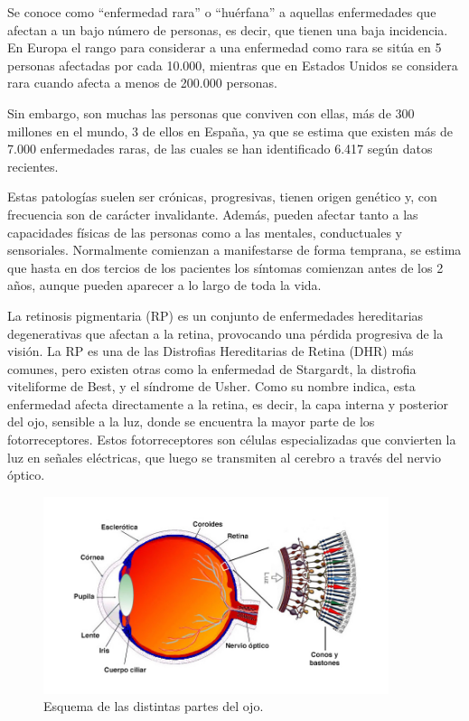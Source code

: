 \documentclass[11pt,spanish,listoffigures,listoftables]{tfgetsinf}
\begin{document}
Se conoce como “enfermedad rara” o “huérfana” a aquellas enfermedades que afectan a un bajo número de personas, es decir, que tienen una baja incidencia. En Europa el rango para considerar a una enfermedad como rara se sitúa en 5 personas afectadas por cada 10.000, mientras que en Estados Unidos se considera rara cuando afecta a menos de 200.000 personas\cite{ENF}.

Sin embargo, son muchas las personas que conviven con ellas, más de 300 millones en el mundo, 3 de ellos en España, ya que se estima que existen más de 7.000 enfermedades raras, de las cuales se han identificado 6.417 según datos recientes\cite{CON}.

Estas patologías suelen ser crónicas, progresivas, tienen origen genético y, con frecuencia son de carácter invalidante. Además, pueden afectar tanto a las capacidades físicas de las personas como a las mentales, conductuales y sensoriales. Normalmente comienzan a manifestarse de forma temprana, se estima que hasta en dos tercios de los pacientes los síntomas comienzan antes de los 2 años, aunque pueden aparecer a lo largo de toda la vida. 

La retinosis pigmentaria (\acs{RP}) es un conjunto de enfermedades hereditarias degenerativas que afectan a la retina, provocando una pérdida progresiva de la visión. La \acs{RP} es una de las Distrofias Hereditarias de Retina (\acs{DHR}) más comunes, pero existen otras como la enfermedad de Stargardt, la distrofia viteliforme de Best, y el síndrome de Usher. Como su nombre indica, esta enfermedad afecta directamente a la retina, es decir, la capa interna y posterior del ojo, sensible a la luz, donde se encuentra la mayor parte de los fotorreceptores. Estos fotorreceptores son células especializadas que convierten la luz en señales eléctricas, que luego se transmiten al cerebro a través del nervio óptico\cite{GAR}.

\begin{figure}[H]
   \centering
   \includegraphics[width=0.9\textwidth]{retina.jpg}
   \caption{Esquema de las distintas partes del ojo.}
   \label{fig:etiqueta_opcional21}
\end{figure}
\end{document}
